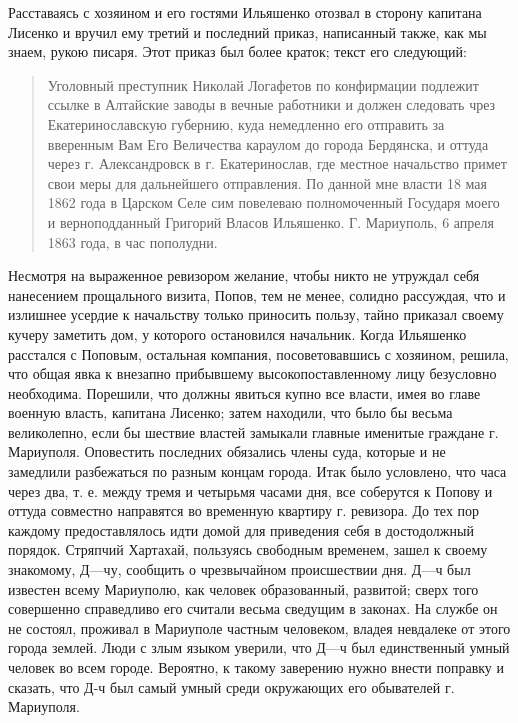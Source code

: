 \documentclass[a4paper,20pt]{article}
\begin{document}
Расставаясь с хозяином и его гостями Ильяшенко
отозвал в сторону капитана Лисенко и вручил ему третий
и последний приказ, написанный также, как мы знаем,
рукою писаря. Этот приказ был более краток; текст
его следующий: 

\begin{quote}
\em\bfseries
	
Уголовный преступник Николай Логафетов по конфирмации подлежит ссылке в
Алтайские заводы в вечные работники и должен следовать чрез
Екатеринославскую губернию, куда немедленно его отправить за вверенным
Вам Его Величества караулом до города Бердянска, и оттуда через г.
Александровск в г. Екатеринослав, где местное начальство примет свои
меры для дальнейшего отправления. По данной мне власти 18 мая 1862 года
в Царском Селе сим повелеваю полномоченный Государя моего и
верноподданный Григорий Власов Ильяшенко. Г. Мариуполь, 6 апреля 1863
года, в час пополудни.

\end{quote}

Несмотря на выраженное ревизором желание, чтобы
никто не утруждал себя нанесением прощального визита,
Попов, тем не менее, солидно рассуждая, что и излишнее
усердие к начальству только приносить пользу, тайно приказал 
своему кучеру заметить дом, у которого остановился
начальник. Когда Ильяшенко расстался с Поповым, остальная компания, 
посоветовавшись с хозяином, решила, что
общая явка к внезапно прибывшему высокопоставленному
лицу безусловно необходима. Порешили, что должны явиться
купно все власти, имея во главе военную власть, капитана
Лисенко; затем находили, что было бы весьма великолепно,
если бы шествие властей замыкали главные именитые
граждане г. Мариуполя. Оповестить последних обязались
члены суда, которые и не замедлили разбежаться по разным концам города. Итак
было условлено, что часа через два, т. е. между тремя и четырьмя часами дня,
все соберутся к Попову и оттуда совместно направятся во временную квартиру г.
ревизора. До тех пор каждому предоставлялось идти домой
для приведения себя в достодолжный порядок. Стряпчий Хартахай, пользуясь
свободным временем, зашел к своему знакомому, Д—чу, сообщить о чрезвычайном
происшествии дня. Д—ч был известен всему Мариуполю, как человек образованный,
развитой; сверх того совершенно справедливо его считали весьма сведущим в
законах.  На службе он не состоял, проживал в Мариуполе частным человеком,
владея невдалеке от этого города землей. Люди с злым языком уверили, что Д—ч
был единственный умный человек во всем городе. Вероятно, к такому заверению
нужно внести поправку и сказать, что Д-ч был самый умный среди окружающих его
обывателей г. Мариуполя.
\end{document}
